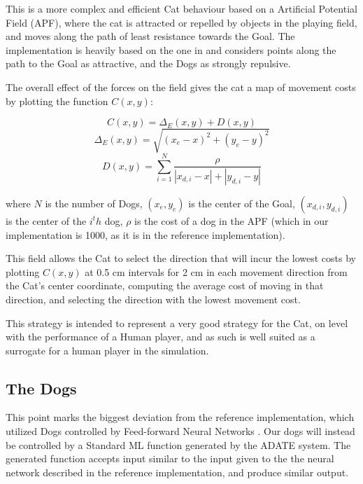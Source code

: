 This is a more complex and efficient Cat behaviour based on a Artificial
Potential Field (APF), where the cat is attracted or repelled by objects in the
playing field, and moves along the path of least resistance towards the Goal.
The implementation is heavily based on the one in
\citet[Chap.~5.1.1.3]{yannakakis2005ai} and considers points along the path to
the Goal as attractive, and the Dogs as strongly repulsive.

The overall effect of the forces on the field gives the cat a map of movement
costs by plotting the function $C(x,y)$:

\begin{equation}
  \label{eq:1}
  C(x,y) = \Delta_E(x,y) + D(x,y)
\end{equation}
\begin{equation}
  \label{eq:2}
  \Delta_E(x,y) = \sqrt{(x_e - x)^2 + (y_e - y)^2}
\end{equation}
\begin{equation}
  \label{eq:3}
  D(x,y) = \sum^N_{i=1} \frac{\rho}{|x_{d,i} - x| + |y_{d,i}-y|}
\end{equation}

where \(N\) is the number of Dogs, \((x_e,y_e)\) is the center of the Goal,
\((x_{d,i},y_{d,i})\) is the center of the \(i^th\) dog, \(\rho\) is the cost of
a dog in the APF (which in our implementation is 1000, as it is in the reference
implementation).

This field allows the Cat to select the direction that will incur the lowest
costs by plotting $C(x,y)$ at 0.5 cm intervals for 2 cm in each movement
direction from the Cat's center coordinate, computing the average cost of moving
in that direction, and selecting the direction with the lowest movement cost.

This strategy is intended to represent a very good strategy for the Cat, on
level with the performance of a Human player, and as such is well suited as a
surrogate for a human player in the simulation.

\subsection{The Dogs}
\label{sec:dogs}

This point marks the biggest deviation from the reference implementation, which
utilized Dogs controlled by Feed-forward Neural Networks
\citep[Chap.~5.1.2]{yannakakis2005ai}.  Our dogs will instead be controlled by a
Standard ML function generated by the ADATE system. The generated function
accepts input similar to the input given to the the neural network described in
the reference implementation, and produce similar output.

